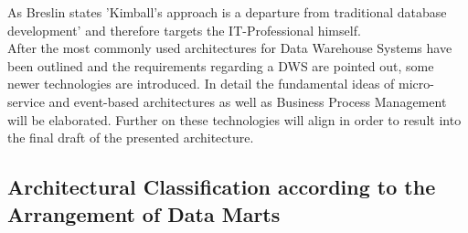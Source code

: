 As Breslin states 'Kimball's approach is a departure from traditional database development'\cite[p.~19]{KimbalVSInmon} and therefore targets the IT-Professional himself.\newline
\\
After the most commonly used architectures for Data Warehouse Systems have been outlined and the requirements regarding a DWS are pointed out, some newer technologies are introduced. In detail the fundamental ideas of micro-service and event-based architectures as well as Business Process Management will be elaborated. Further on these technologies will align in order to result into the final draft of the presented architecture.

\subsection{Architectural Classification according to the Arrangement of Data Marts}
\cite{sinz}
